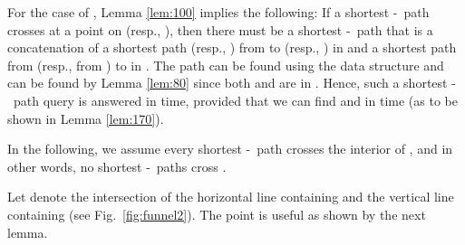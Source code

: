 \documentclass[english,runningheads,11pt]{llncs}
\def\st{-}
\begin{document}
For the case of ,
Lemma \ref{lem:100} implies the following: If a shortest \st\ path
crosses  at a point on  (resp.,
), then there must be a shortest \st\ path that is a
concatenation of a shortest path  (resp., ) from  to  (resp., ) in
 and a shortest path  from  (resp.,  from ) to  in .
The path  can be found using the data structure 
and  can be found by Lemma \ref{lem:80} since both  and  are in .
Hence, such a shortest \st\ path query is answered in  time, provided that
we can find  and  in  time (as to be shown in Lemma \ref{lem:170}).

In the following, we assume every shortest \st\ path crosses the interior of , and in other words, no shortest \st\ paths cross .

Let  denote the
intersection of the horizontal line containing  and the
vertical line containing  (see Fig.~\ref{fig:funnel2}).
The point  is useful as shown by the next lemma.
\end{document}
